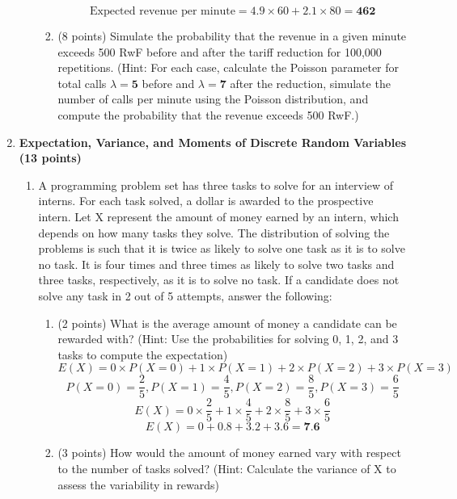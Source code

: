 \documentclass[a3paper,12pt]{article} %
\begin{document}
\begin{enumerate}
\begin{enumerate}
\begin{enumerate}
            \[
                \text{Expected revenue per minute} = 4.9 \times 60 + 2.1 \times 80 = \textbf{462}
            \]
            \item (8 points) Simulate the probability that the revenue in a given minute exceeds 500 RwF before and after the tariff reduction for 100,000 repetitions. (Hint: For each case, calculate the Poisson parameter for total calls \( \lambda = \textbf{5}\) before and \( \lambda = \textbf{7}\) after the reduction, simulate the number of calls per minute using the Poisson distribution, and compute the probability that the revenue exceeds 500 RwF.)
        \end{enumerate}
    \end{enumerate}
    \newpage
    \item \textbf{Expectation, Variance, and Moments of Discrete Random Variables (13 points)}
    \begin{enumerate}
        \item A programming problem set has three tasks to solve for an interview of interns. For each task solved, a dollar is awarded to the prospective intern. Let X represent the amount of money earned by an intern, which depends on how many tasks they solve. The distribution of solving the problems is such that it is twice as likely to solve one task as it is to solve no task. It is four times and three times as likely to solve two tasks and three tasks, respectively, as it is to solve no task. If a candidate does not solve any task in 2 out of 5 attempts, answer the following:
        \begin{enumerate}
            \item (2 points) What is the average amount of money a candidate can be rewarded with? (Hint: Use the probabilities for solving 0, 1, 2, and 3 tasks to compute the expectation)
            \[
                E(X) = 0 \times P(X = 0) + 1 \times P(X = 1) + 2 \times P(X = 2) + 3 \times P(X = 3)
            \]
            \[
                P(X = 0) = \frac{2}{5}, P(X = 1) = \frac{4}{5}, P(X = 2) = \frac{8}{5}, P(X = 3) = \frac{6}{5}
            \]
            \[
                E(X) = 0 \times \frac{2}{5} + 1 \times \frac{4}{5} + 2 \times \frac{8}{5} + 3 \times \frac{6}{5}
            \]
            \[
                E(X) = 0 + 0.8 + 3.2 + 3.6 = \textbf{7.6}
            \]
            \item (3 points) How would the amount of money earned vary with respect to the number of tasks solved? (Hint: Calculate the variance of X to assess the variability in rewards)

\end{enumerate}
\end{enumerate}
\end{enumerate}
\end{document}
